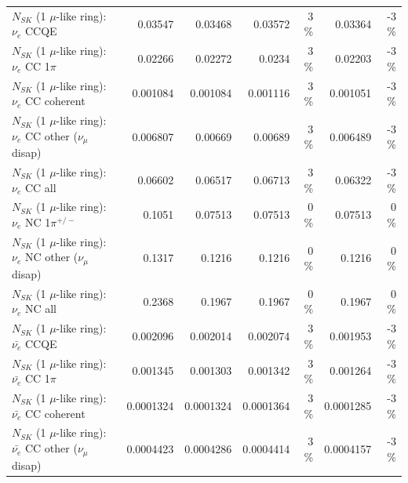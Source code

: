 \begin{table}
\begin{tabular}{| l | r | r | r  r | r  r |}
\hline
\hline
\hline
                                      $N_{SK}$ (1 $\mu$-like ring): $\nu_e$ CCQE &         0.03547 &         0.03468 &         0.03572 &        3 \%  &         0.03364 &       -3 \%  \\ 
                                 $N_{SK}$ (1 $\mu$-like ring): $\nu_e$ CC 1$\pi$ &         0.02266 &         0.02272 &          0.0234 &        3 \%  &         0.02203 &       -3 \%  \\ 
                               $N_{SK}$ (1 $\mu$-like ring): $\nu_e$ CC coherent &        0.001084 &        0.001084 &        0.001116 &        3 \%  &        0.001051 &       -3 \%  \\ 
                $N_{SK}$ (1 $\mu$-like ring): $\nu_e$ CC other ($\nu_\mu$ disap) &        0.006807 &         0.00669 &         0.00689 &        3 \%  &        0.006489 &       -3 \%  \\ 
                                  $N_{SK}$ (1 $\mu$-like ring): $\nu_{e}$ CC all &         0.06602 &         0.06517 &         0.06713 &        3 \%  &         0.06322 &       -3 \%  \\ 
\hline
                           $N_{SK}$ (1 $\mu$-like ring): $\nu_e$ NC 1$\pi^{+/-}$ &          0.1051 &         0.07513 &         0.07513 &        0 \%  &         0.07513 &        0 \%  \\ 
                $N_{SK}$ (1 $\mu$-like ring): $\nu_e$ NC other ($\nu_\mu$ disap) &          0.1317 &          0.1216 &          0.1216 &        0 \%  &          0.1216 &        0 \%  \\ 
                                  $N_{SK}$ (1 $\mu$-like ring): $\nu_{e}$ NC all &          0.2368 &          0.1967 &          0.1967 &        0 \%  &          0.1967 &        0 \%  \\ 
\hline
\hline
\hline
                                $N_{SK}$ (1 $\mu$-like ring): $\bar{\nu_e}$ CCQE &        0.002096 &        0.002014 &        0.002074 &        3 \%  &        0.001953 &       -3 \%  \\ 
                           $N_{SK}$ (1 $\mu$-like ring): $\bar{\nu_e}$ CC 1$\pi$ &        0.001345 &        0.001303 &        0.001342 &        3 \%  &        0.001264 &       -3 \%  \\ 
                         $N_{SK}$ (1 $\mu$-like ring): $\bar{\nu_e}$ CC coherent &       0.0001324 &       0.0001324 &       0.0001364 &        3 \%  &       0.0001285 &       -3 \%  \\ 
          $N_{SK}$ (1 $\mu$-like ring): $\bar{\nu_e}$ CC other ($\nu_\mu$ disap) &       0.0004423 &       0.0004286 &       0.0004414 &        3 \%  &       0.0004157 &       -3 \%  \\ 

\end{tabular}
\end{table}
